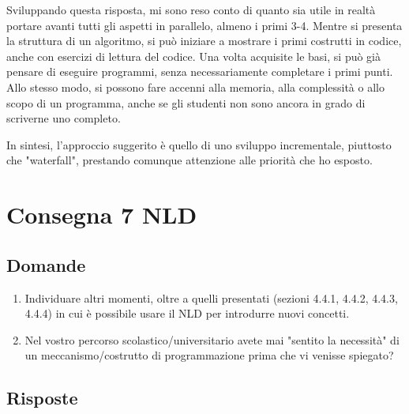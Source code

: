 \documentclass[a4paper]{article}
\begin{document}
Sviluppando questa risposta, mi sono reso conto di quanto sia utile in realtà portare avanti tutti gli aspetti in parallelo, almeno i primi 3-4. Mentre si presenta la struttura di un algoritmo, si può iniziare a mostrare i primi costrutti in codice, anche con esercizi di lettura del codice. Una volta acquisite le basi, si può già pensare di eseguire programmi, senza necessariamente completare i primi punti. Allo stesso modo, si possono fare accenni alla memoria, alla complessità o allo scopo di un programma, anche se gli studenti non sono ancora in grado di scriverne uno completo.

In sintesi, l'approccio suggerito è quello di uno sviluppo incrementale, piuttosto che "waterfall", prestando comunque attenzione alle priorità che ho esposto.

\section{Consegna 7 \large NLD}

\subsection{Domande}
\begin{enumerate}
	\item Individuare altri momenti, oltre a quelli presentati (sezioni 4.4.1, 4.4.2, 4.4.3, 4.4.4) in cui è possibile usare il NLD per introdurre nuovi concetti.
	\item Nel vostro percorso scolastico/universitario avete mai "sentito la necessità" di un meccanismo/costrutto di programmazione prima che vi venisse spiegato?
\end{enumerate}
\subsection{Risposte}
\end{document}
